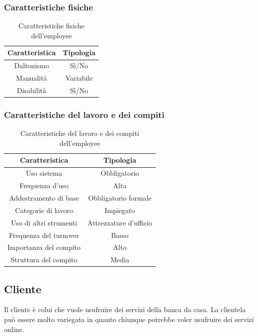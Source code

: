 \clearpage
\subsubsection{Caratteristiche fisiche}
\begin{table}[h]
	\centering
	\begin{tabular}{|c|c|}
		\hline
		\textbf{Caratteristica} & \textbf{Tipologia} \\
		\hline
		Daltonismo & Sì/No \\
		\hline
		Manualità & Variabile \\
		\hline
		Disabilità & Sì/No \\
		\hline
	\end{tabular}
	\caption{Caratteristiche fisiche dell'employee}
\end{table}

\subsubsection{Caratteristiche del lavoro e dei compiti}
\begin{table}[h]
	\centering
	\begin{tabular}{|c|c|}
		\hline
		\textbf{Caratteristica} & \textbf{Tipologia} \\
		\hline
		Uso sistema & Obbligatorio \\
		\hline
		Frequenza d'uso & Alta \\
		\hline
		Addestramento di base & Obbligatorio formale \\
		\hline
		Categorie di lavoro & Impiegato \\
		\hline
		Uso di altri strumenti & Attrezzature d'ufficio \\
		\hline
		Frequenza del turnover & Basso \\
		\hline
		Importanza del compito & Alto \\
		\hline
		Struttura del compito & Media \\
		\hline
	\end{tabular}
	\caption{Caratteristiche del lavoro e dei compiti dell'employee}
\end{table}

\clearpage
\subsection{Cliente}
Il cliente è colui che vuole usufruire dei servizi della banca da casa. La clientela può essere molto variegata in quanto chiunque potrebbe voler usufruire dei servizi online.

